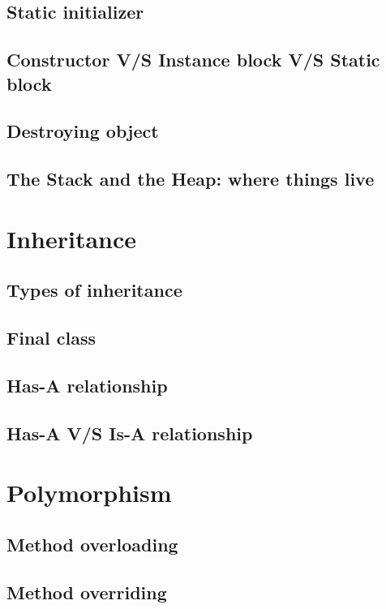 \documentclass[14pt,fleqn]{extbook} %
\begin{document}
\subsection{Static initializer}

\subsection{Constructor V/S Instance block V/S Static block}

\subsection{Destroying object}

\subsection{The Stack and the Heap: where things live}

\section{Inheritance}

\subsection{Types of inheritance}

\subsection{Final class}

\subsection{Has-A relationship}

\subsection{Has-A V/S Is-A relationship}

\section{Polymorphism}

\subsection{Method overloading}

\subsection{Method overriding}

\end{document}
